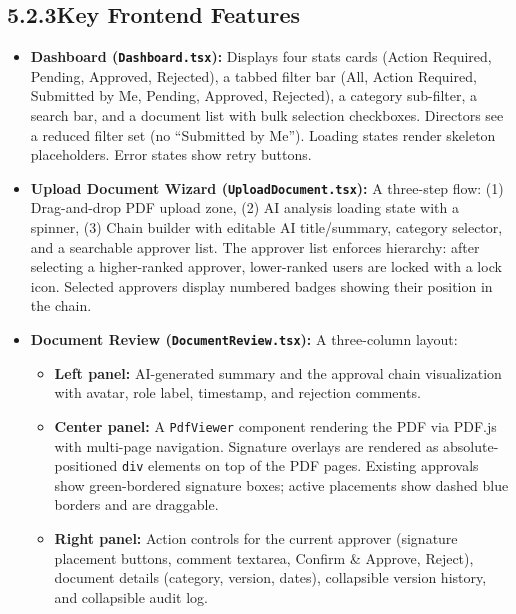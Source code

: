 \documentclass[12pt,a4paper]{report}
\begin{document}
\subsection*{5.2.3\quad Key Frontend Features}

\begin{itemize}
    \item \textbf{Dashboard (\texttt{Dashboard.tsx}):} Displays four stats cards (Action Required, Pending, Approved, Rejected), a tabbed filter bar (All, Action Required, Submitted by Me, Pending, Approved, Rejected), a category sub-filter, a search bar, and a document list with bulk selection checkboxes. Directors see a reduced filter set (no ``Submitted by Me''). Loading states render skeleton placeholders. Error states show retry buttons.

    \item \textbf{Upload Document Wizard (\texttt{UploadDocument.tsx}):} A three-step flow: (1) Drag-and-drop PDF upload zone, (2) AI analysis loading state with a spinner, (3) Chain builder with editable AI title/summary, category selector, and a searchable approver list. The approver list enforces hierarchy: after selecting a higher-ranked approver, lower-ranked users are locked with a lock icon. Selected approvers display numbered badges showing their position in the chain.

    \item \textbf{Document Review (\texttt{DocumentReview.tsx}):} A three-column layout:
    \begin{itemize}
        \item \textbf{Left panel:} AI-generated summary and the approval chain visualization with avatar, role label, timestamp, and rejection comments.
        \item \textbf{Center panel:} A \texttt{PdfViewer} component rendering the PDF via PDF.js with multi-page navigation. Signature overlays are rendered as absolute-positioned \texttt{div} elements on top of the PDF pages. Existing approvals show green-bordered signature boxes; active placements show dashed blue borders and are draggable.
        \item \textbf{Right panel:} Action controls for the current approver (signature placement buttons, comment textarea, Confirm \& Approve, Reject), document details (category, version, dates), collapsible version history, and collapsible audit log.
    \end{itemize}


\end{itemize}
\end{document}
